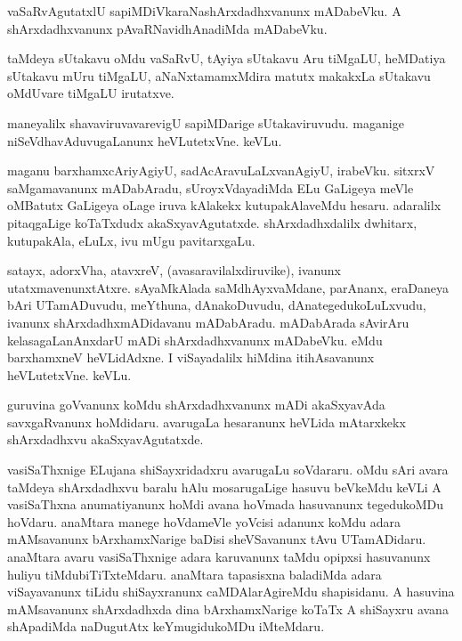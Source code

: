 \documentclass{article}
\begin{document}
\begin{mng}%
vaSaRvAgutatxlU sapiMDiVkaraNashArxdadhxvanunx mADabeVku.
A shArxdadhxvanunx pAvaRNavidhAnadiMda mADabeVku.
\end{mng}

\begin{mng}%
taMdeya sUtakavu oMdu vaSaRvU, tAyiya sUtakavu Aru
tiMgaLU, heMDatiya sUtakavu mUru tiMgaLU, aNaNxtamamxMdira matutx
makakxLa sUtakavu oMdUvare tiMgaLU irutatxve.
\end{mng}

\begin{mng}%
maneyalilx shavaviruvavarevigU sapiMDarige sUtakaviruvudu.
maganige niSeVdhavAduvugaLanunx heVLutetxVne. keVLu.
\end{mng}

\begin{mng}%
maganu barxhamxcAriyAgiyU, sadAcAravuLaLxvanAgiyU,
irabeVku. sitxrxV saMgamavanunx mADabAradu, sUroyxVdayadiMda
ELu GaLigeya meVle oMBatutx GaLigeya oLage iruva kAlakekx kutupakAlaveMdu
hesaru. adaralilx pitaqgaLige koTaTxdudx akaSxyavAgutatxde. shArxdadhxdalilx
dwhitarx, kutupakAla, eLuLx, ivu mUgu pavitarxgaLu.
\end{mng}

\begin{mng}%
satayx, adorxVha, atavxreV, (avasaravilalxdiruvike), ivanunx
utatxmavenunxtAtxre. sAyaMkAlada saMdhAyxvaMdane, parAnanx, eraDaneya bAri
UTamADuvudu, meYthuna, dAnakoDuvudu, dAnategedukoLuLxvudu,
ivanunx shArxdadhxmADidavanu mADabAradu. mADabArada sAvirAru
kelasagaLanAnxdarU mADi shArxdadhxvanunx mADabeVku. eMdu barxhamxneV heVLidAdxne.
I viSayadalilx hiMdina itihAsavanunx heVLutetxVne. keVLu.
\end{mng}

\begin{mng}%
guruvina goVvanunx koMdu shArxdadhxvanunx mADi akaSxyavAda
savxgaRvanunx hoMdidaru. avarugaLa hesaranunx heVLida mAtarxkekx shArxdadhxvu
akaSxyavAgutatxde.
\end{mng}

\begin{mng}%
vasiSaThxnige ELujana shiSayxridadxru avarugaLu soVdararu.
oMdu sAri avara taMdeya shArxdadhxvu baralu hAlu mosarugaLige hasuvu
beVkeMdu keVLi A vasiSaThxna anumatiyanunx hoMdi avana hoVmada hasuvanunx
tegedukoMDu hoVdaru. anaMtara manege hoVdameVle yoVcisi
adanunx koMdu adara mAMsavanunx bArxhamxNarige baDisi sheVSavanunx tAvu
UTamADidaru. anaMtara avaru vasiSaThxnige adara karuvanunx taMdu opipxsi
hasuvanunx huliyu tiMdubiTiTxteMdaru. anaMtara tapasisxna baladiMda adara
viSayavanunx tiLidu shiSayxranunx caMDAlarAgireMdu shapisidanu. A hasuvina
mAMsavanunx shArxdadhxda dina bArxhamxNarige koTaTx A shiSayxru avana shApadiMda
naDugutAtx keYmugidukoMDu iMteMdaru.
\end{mng}
\end{document}
